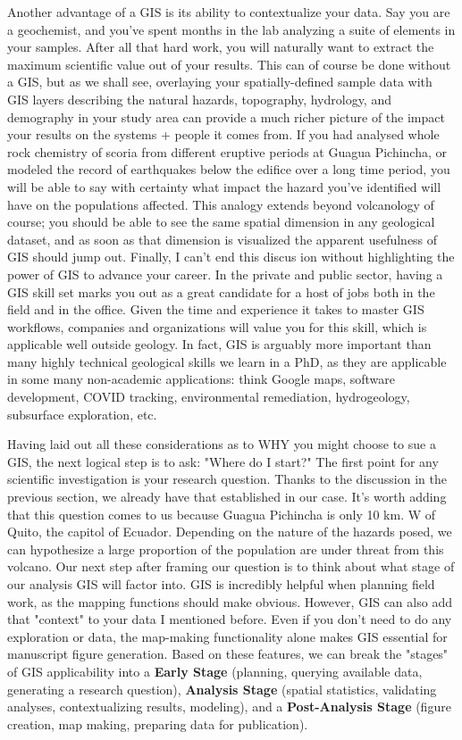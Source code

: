 \documentclass{article}
\begin{document}
Another advantage of a GIS is its ability to contextualize your data. Say you are a geochemist, and you've spent months in the lab analyzing a suite of elements in your samples. After all that hard work, you will naturally want to extract the maximum scientific value out of your results. This can of course be done without a GIS, but as we shall see, overlaying your spatially-defined sample data with GIS layers describing the natural hazards, topography, hydrology, and demography in your study area can provide a much richer picture of the impact your results on the systems + people it comes from. If you had analysed whole rock chemistry of scoria from different eruptive periods at Guagua Pichincha, or modeled the record of earthquakes below the edifice over a long time period, you will be able to say with certainty what impact the hazard you've identified will have on the populations affected. This analogy extends beyond volcanology of course; you should be able to see the same spatial dimension in any geological dataset, and as soon as that dimension is visualized the apparent usefulness of GIS should jump out. Finally, I can't end this discus ion without highlighting the power of GIS to advance your career. In the private and public sector, having a GIS skill set marks you out as a great candidate for a host of jobs both in the field and in the office. Given the time and experience it takes to master GIS workflows, companies and organizations will value you for this skill, which is applicable well outside geology. In fact, GIS is arguably more important than many highly technical geological skills we learn in a PhD, as they are applicable in some many non-academic applications: think Google maps, software development, COVID tracking, environmental remediation, hydrogeology, subsurface exploration, etc. 

Having laid out all these considerations as to WHY you might choose to sue a GIS, the next logical step is to ask: "Where do I start?" The first point for any scientific investigation is your research question. Thanks to the discussion in the previous section, we already have that established in our case. It's worth adding that this question comes to us because Guagua Pichincha is only 10 km. W of Quito, the capitol of Ecuador. Depending on the nature of the hazards posed, we can hypothesize a large proportion of the population are under threat from this volcano. Our next step after framing our question is to think about what stage of our analysis GIS will factor into. GIS is incredibly helpful when planning field work, as the mapping functions should make obvious. However, GIS can also add that "context" to your data I mentioned before. Even if you don't need to do any exploration or data, the map-making functionality alone makes GIS essential for manuscript figure generation. Based on these features, we can break the "stages" of GIS applicability into a \textbf{Early Stage} (planning, querying available data, generating a research question), \textbf{Analysis Stage} (spatial statistics, validating analyses, contextualizing results, modeling), and a \textbf{Post-Analysis Stage} (figure creation, map making, preparing data for publication).  
\end{document}
